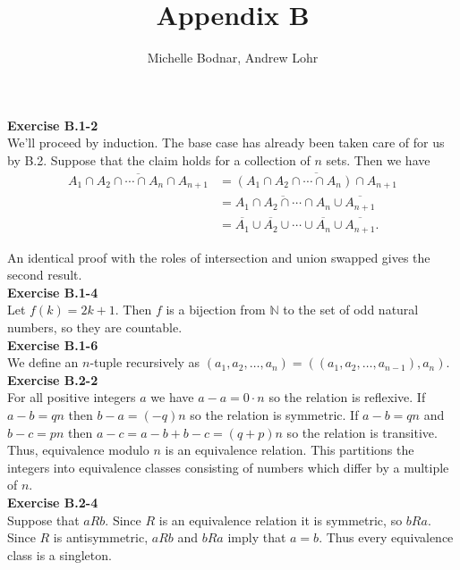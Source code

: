 \documentclass{article}
\title{Appendix B}
\author{Michelle Bodnar, Andrew Lohr}
\begin{document}
\maketitle

\noindent\textbf{Exercise B.1-2}\\

We'll proceed by induction.  The base case has already been taken care of for us by B.2.  Suppose that the claim holds for a collection of $n$ sets.  Then we have 
\begin{align*}
\overline{A_1 \cap A_2 \cap \cdots \cap A_n \cap A_{n+1}} &= \overline{(A_1 \cap A_2 \cap \cdots \cap A_n) \cap A_{n+1}} \\
&= \overline{A_1 \cap A_2 \cap \cdots \cap A_n} \cup \overline{A_{n+1}} \\
&= \overline{A_1} \cup \overline{A_2} \cup \cdots \cup \overline{A_n} \cup \overline{A_{n+1}}.
\end{align*}

An identical proof with the roles of intersection and union swapped gives the second result.\\

\noindent\textbf{Exercise B.1-4}\\

Let $f(k) = 2k+1$.  Then $f$ is a bijection from $\mathbb{N}$ to the set of odd natural numbers, so they are countable. \\

\noindent\textbf{Exercise B.1-6}\\

We define an $n$-tuple recursively as $(a_1, a_2, \ldots, a_n) = ((a_1, a_2, \ldots, a_{n-1}), a_n)$.\\

\noindent\textbf{Exercise B.2-2}\\

For all positive integers $a$ we have $a - a = 0\cdot n$ so the relation is reflexive.  If $a-b = qn$ then $b-a = (-q)n$ so the relation is symmetric.  If $a - b = qn$ and $b-c = pn$ then $a - c = a - b + b - c = (q+p)n$ so the relation is transitive. Thus, equivalence modulo $n$ is an equivalence relation.  This partitions the integers into equivalence classes consisting of numbers which differ by a multiple of $n$.  \\

\noindent\textbf{Exercise B.2-4}\\

Suppose that $a R b$.  Since $R$ is an equivalence relation it is symmetric, so $bRa$.  Since $R$ is antisymmetric, $aRb$ and $bRa$ imply that $a = b$.  Thus every equivalence class is a singleton. \\
\end{document}
